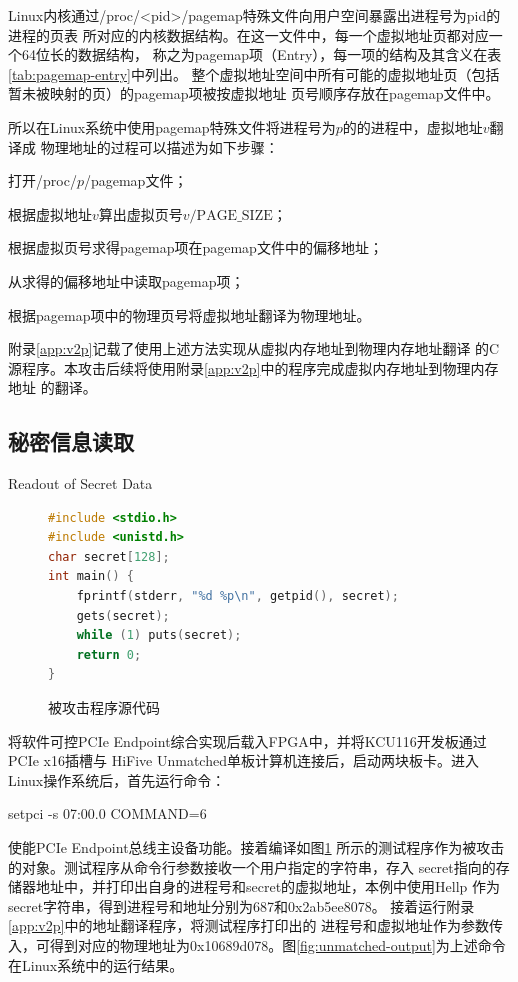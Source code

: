 Linux内核通过/proc/<pid>/pagemap特殊文件向用户空间暴露出进程号为pid的进程的页表
所对应的内核数据结构。在这一文件中，每一个虚拟地址页都对应一个64位长的数据结构，
称之为pagemap项（Entry），每一项的结构及其含义在表\ref{tab:pagemap-entry}中列出。
整个虚拟地址空间中所有可能的虚拟地址页（包括暂未被映射的页）的pagemap项被按虚拟地址
页号顺序存放在pagemap文件中。\cite{pagemap}

所以在Linux系统中使用pagemap特殊文件将进程号为$p$的的进程中，虚拟地址$v$翻译成
物理地址的过程可以描述为如下步骤：
\begin{compactenum}
	\item 打开/proc/$p$/pagemap文件；
	\item 根据虚拟地址$v$算出虚拟页号$v / \text{PAGE\_SIZE}$；
	\item 根据虚拟页号求得pagemap项在pagemap文件中的偏移地址；
	\item 从求得的偏移地址中读取pagemap项；
	\item 根据pagemap项中的物理页号将虚拟地址翻译为物理地址。
\end{compactenum}

附录\ref{app:v2p}记载了使用上述方法实现从虚拟内存地址到物理内存地址翻译
的C源程序。本攻击后续将使用附录\ref{app:v2p}中的程序完成虚拟内存地址到物理内存地址
的翻译。

\subsection{秘密信息读取}{Readout of Secret Data}

\begin{figure}[ht]
	\centering
	\begin{lstlisting}[language=c, escapechar=|]
#include <stdio.h>
#include <unistd.h>
char secret[128];
int main() {
	fprintf(stderr, "%d %p\n", getpid(), secret);
	gets(secret);
	while (1) puts(secret);
	return 0;
}
	\end{lstlisting}
	\caption{被攻击程序源代码}
	\label{fig:target-src}
\end{figure}

将软件可控PCIe Endpoint综合实现后载入FPGA中，并将KCU116开发板通过PCIe x16插槽与
HiFive Unmatched单板计算机连接后，启动两块板卡。进入Linux操作系统后，首先运行命令：

setpci -s 07:00.0 COMMAND=6

\noindent 使能PCIe Endpoint总线主设备功能。接着编译如图\ref{fig:target-src}
所示的测试程序作为被攻击的对象。测试程序从命令行参数接收一个用户指定的字符串，存入
secret指向的存储器地址中，并打印出自身的进程号和secret的虚拟地址，本例中使用Hellp
作为secret字符串，得到进程号和地址分别为687和0x2ab5ee8078。
接着运行附录\ref{app:v2p}中的地址翻译程序，将测试程序打印出的
进程号和虚拟地址作为参数传入，可得到对应的物理地址为0x10689d078。图\ref{fig:unmatched-output}为上述命令
在Linux系统中的运行结果。

